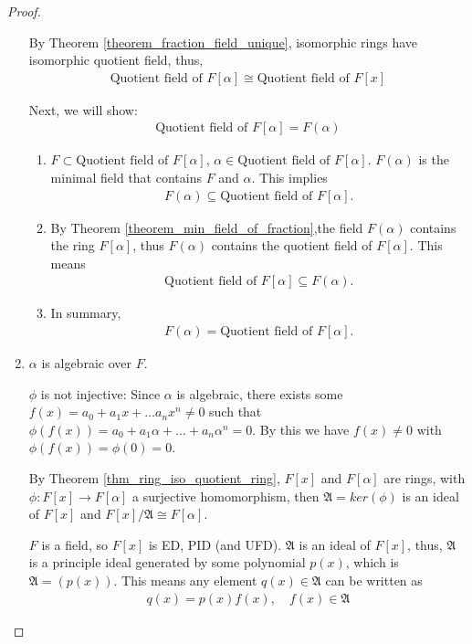 \documentclass[utf8]{ctexbook}
\begin{document}
\begin{proof}
\begin{enumerate}
{By Theorem \ref{theorem_fraction_field_unique}, isomorphic rings have isomorphic quotient field, thus,
\begin{align*}
\mbox{Quotient field of } F[\alpha] \cong \mbox{Quotient field of } F[x]
\end{align*}

Next, we will show:
\begin{align*}
\mbox{Quotient field of } F[\alpha] = F(\alpha)
\end{align*}

\begin{enumerate}
\item{$F \subset \mbox{Quotient field of } F[\alpha] $, $\alpha \in \mbox{Quotient field of } F[\alpha] $. $F(\alpha)$ is the minimal field that contains $F$ and $\alpha$. This implies
\begin{align*}
F(\alpha) \subseteq \mbox{Quotient field of } F[\alpha] .
\end{align*}
}
\item{By Theorem \ref{theorem_min_field_of_fraction},the field $F(\alpha)$ contains the ring $F[\alpha]$, thus $F(\alpha)$ contains the quotient field of $F[\alpha]$. This means
\begin{align*}
\mbox{Quotient field of } F[\alpha] \subseteq F(\alpha) .
\end{align*}
}
\item{In summary,
\begin{align*}
F(\alpha) = \mbox{Quotient field of } F[\alpha] .
\end{align*}
}
\end{enumerate}

}
\item{$\alpha$ is algebraic over $F$.

$\phi$ is not injective: Since $\alpha $ is algebraic, there exists some $f(x) = a_0 + a_1 x + \ldots a_n x^n \neq 0$ such that $\phi(f(x)) = a_0 + a_1 \alpha + \ldots + a_n \alpha^n = 0$. By this we have $f(x ) \neq 0$ with $\phi(f(x)) = \phi(0) = 0$. 

By Theorem \ref{thm_ring_iso_quotient_ring}, $F[x]$ and $F[\alpha]$ are rings, with $\phi: F[x] \longrightarrow F[\alpha]$ a surjective homomorphism, then $\mathfrak{A} = ker(\phi)$ is an ideal of $F[x]$ and $F[x] /\mathfrak{A} \cong F[\alpha]$.

$F$ is a field, so $F[x]$ is ED, PID (and UFD). $\mathfrak{A}$ is an ideal of $F[x]$, thus, $\mathfrak{A}$ is a principle ideal generated by some polynomial $p(x)$, which is $\mathfrak{A}= (p(x))$. This means any element $q(x) \in \mathfrak{A}$ can be written as
\begin{align*}
q(x) = p(x) f(x), \quad f(x) \in \mathfrak{A}
\end{align*}

}
\end{enumerate}
\end{proof}
\end{document}
